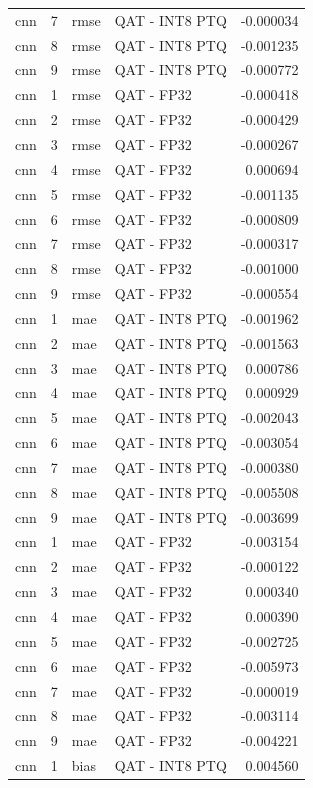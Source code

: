 \begin{tabular}{lrllr}
cnn & 7 & rmse & QAT - INT8 PTQ & -0.000034 \\
cnn & 8 & rmse & QAT - INT8 PTQ & -0.001235 \\
cnn & 9 & rmse & QAT - INT8 PTQ & -0.000772 \\
cnn & 1 & rmse & QAT - FP32 & -0.000418 \\
cnn & 2 & rmse & QAT - FP32 & -0.000429 \\
cnn & 3 & rmse & QAT - FP32 & -0.000267 \\
cnn & 4 & rmse & QAT - FP32 & 0.000694 \\
cnn & 5 & rmse & QAT - FP32 & -0.001135 \\
cnn & 6 & rmse & QAT - FP32 & -0.000809 \\
cnn & 7 & rmse & QAT - FP32 & -0.000317 \\
cnn & 8 & rmse & QAT - FP32 & -0.001000 \\
cnn & 9 & rmse & QAT - FP32 & -0.000554 \\
cnn & 1 & mae & QAT - INT8 PTQ & -0.001962 \\
cnn & 2 & mae & QAT - INT8 PTQ & -0.001563 \\
cnn & 3 & mae & QAT - INT8 PTQ & 0.000786 \\
cnn & 4 & mae & QAT - INT8 PTQ & 0.000929 \\
cnn & 5 & mae & QAT - INT8 PTQ & -0.002043 \\
cnn & 6 & mae & QAT - INT8 PTQ & -0.003054 \\
cnn & 7 & mae & QAT - INT8 PTQ & -0.000380 \\
cnn & 8 & mae & QAT - INT8 PTQ & -0.005508 \\
cnn & 9 & mae & QAT - INT8 PTQ & -0.003699 \\
cnn & 1 & mae & QAT - FP32 & -0.003154 \\
cnn & 2 & mae & QAT - FP32 & -0.000122 \\
cnn & 3 & mae & QAT - FP32 & 0.000340 \\
cnn & 4 & mae & QAT - FP32 & 0.000390 \\
cnn & 5 & mae & QAT - FP32 & -0.002725 \\
cnn & 6 & mae & QAT - FP32 & -0.005973 \\
cnn & 7 & mae & QAT - FP32 & -0.000019 \\
cnn & 8 & mae & QAT - FP32 & -0.003114 \\
cnn & 9 & mae & QAT - FP32 & -0.004221 \\
cnn & 1 & bias & QAT - INT8 PTQ & 0.004560 \\

\end{tabular}

